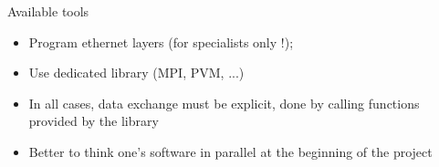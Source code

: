 \documentclass[compress,10pt,aspectratio=169]{beamer}
\begin{document}
    \begin{frame}[fragile]{Available tools}

        \begin{itemize}
            \item Program ethernet layers (for specialists only !);
            \item Use dedicated library (MPI, PVM, ...)
            \item In all cases, data exchange must be explicit, done by calling functions provided by the library
            \item Better to think one's software in parallel at the beginning of the project
        \end{itemize}

    \end{frame}
\end{document}
